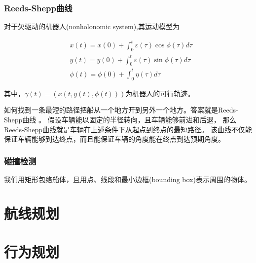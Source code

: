 \subsubsection{Reeds-Shepp曲线}
对于欠驱动的机器人(nonholonomic system),其运动模型为

\begin{equation}
  \begin{aligned}
    & x(t)=x(0)+\int_0^t \varepsilon( \tau ) \cos \phi (\tau) d \tau   \\
    & y(t)=y(0)+\int_0^t \varepsilon( \tau ) \sin \phi (\tau) d \tau   \\
    & \phi (t)= \phi (0) + \int_0^t \eta (\tau) d \tau
  \end{aligned}
\end{equation}

其中，$\gamma(t)=(x(t, y(t), \phi(t)))$为机器人的可行轨迹。

如何找到一条最短的路径把船从一个地方开到另外一个地方。答案就是Reeds-Shepp曲线\cite{reeds1990} 。
假设车辆能以固定的半径转向，且车辆能够前进和后退，
那么Reeds-Shepp曲线就是车辆在上述条件下从起点到终点的最短路径。
该曲线不仅能保证车辆能够到达终点，而且能保证车辆的角度能在终点到达预期角度。


\subsubsection{碰撞检测}
我们用矩形包络船体，且用点、线段和最小边框(bounding box)表示周围的物体。

\section{航线规划}
\label{sec:routeplanning}


\section{行为规划}
\label{sec:behav}
